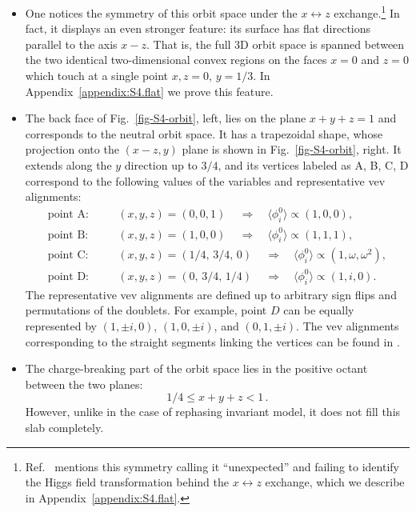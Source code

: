 \documentclass[11pt]{article}
\newcommand{\lr}[1]{ \langle #1 \rangle}
\begin{document}
\begin{itemize}
	\item 
One notices the symmetry of this orbit space under the $x \leftrightarrow z$ exchange.\footnote{Ref.~\cite{Degee:2012sk} 
mentions this symmetry calling it ``unexpected'' and failing to identify the Higgs field transformation
behind the $x \leftrightarrow z$ exchange, which we describe in Appendix~\ref{appendix:S4.flat}.}
In fact, it displays an even stronger feature: its surface has flat directions parallel to the axis $x-z$.
That is, the full 3D orbit space is spanned between the two identical two-dimensional convex regions
on the faces $x = 0$ and $z=0$ which touch at a single point $x, z = 0$, $y = 1/3$.  
In Appendix~\ref{appendix:S4.flat} we prove this feature. 
	\item 
The back face of Fig.~\ref{fig-S4-orbit}, left, lies on the plane $x + y + z = 1$ 
and corresponds to the neutral orbit space. It has a trapezoidal shape, whose projection onto the 
$(x-z,y)$ plane is shown in Fig.~\ref{fig-S4-orbit}, right.
It extends along the $y$ direction up to $3/4$, and its vertices labeled as A, B, C, D correspond to the
following values of the variables and representative vev alignments:
\begin{eqnarray}
\mbox{point A:} &\quad& (x,y,z) = (0,0,1)\, \quad \Rightarrow \quad \lr{\phi_i^0} \propto (1, 0, 0),\nonumber\\
\mbox{point B:} &\quad& (x,y,z) = (1,0,0)\, \quad \Rightarrow \quad \lr{\phi_i^0} \propto (1, 1, 1),\nonumber\\
\mbox{point C:} &\quad& (x,y,z) = (1/4,\, 3/4,\, 0)\, \quad \Rightarrow \quad \lr{\phi_i^0} \propto (1,\omega,\omega^2),\nonumber\\
\mbox{point D:} &\quad& (x,y,z) = (0,\, 3/4,\, 1/4)\, \quad \Rightarrow \quad \lr{\phi_i^0} \propto (1, i, 0).
\label{points-S4-neutral}
\end{eqnarray}
The representative vev alignments are defined up to arbitrary sign flips and permutations of the doublets.
For example, point $D$ can be equally represented by $(1,\pm i,0)$, $(1,0,\pm i)$, and $(0,1,\pm i)$.
The vev alignments corresponding to the straight segments linking the vertices can be found in \cite{Degee:2012sk}.
	\item 
The charge-breaking part of the orbit space lies in the positive octant between the two planes:
\begin{equation}
1/4 \le x + y + z < 1\,.
\end{equation}
However, unlike in the case of rephasing invariant model, it does not fill this slab completely.

\end{itemize}
\end{document}
